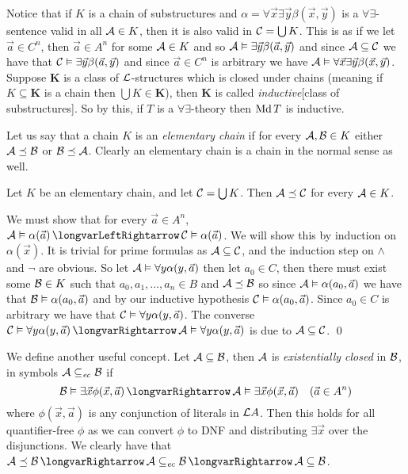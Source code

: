 \eexam

Notice that if $K$ is a chain of substructures and $\alpha=\forall\vec x\exists\vec y\beta(\vec x,\vec y)$ is a $\forall\exists$-sentence valid in all ${\cal A}\in K$, then it is also valid in
${\cal C}=\bigcup K$.
This is as if we let $\vec a\in C^n$, then $\vec a\in A^n$ for some ${\cal A}\in K$ and so ${\cal A}\vDash\exists\vec y\beta(\vec a,\vec y)$ and since ${\cal A}\subseteq{\cal C}$ we have that
${\cal C}\vDash\exists\vec y\beta(\vec a,\vec y)$ and since $\vec a\in C^n$ is arbitrary we have ${\cal A}\vDash\forall\vec x\exists\vec y\beta(\vec x,\vec y)$.
Suppose $\boldsymbol K$ is a class of ${\cal L}$-structures which is closed under chains (meaning if $K\subseteq\boldsymbol K$ is a chain then $\bigcup K\in\boldsymbol K$), then $\boldsymbol K$ is called
{\it inductive}[class of substructures].
So by this, if $T$ is a $\forall\exists$-theory then $\mathop{\rm Md} T$ is inductive.

Let us say that a chain $K$ is an {\it elementary chain} if for every ${\cal A},{\cal B}\in K$ either ${\cal A}\preceq{\cal B}$ or ${\cal B}\preceq{\cal A}$.
Clearly an elementary chain is a chain in the normal sense as well.

\blemm[title=Tarski's Chain Lemma, name=tarskichainlemma]

    Let $K$ be an elementary chain, and let ${\cal C}=\bigcup K$.
    Then ${\cal A}\preceq{\cal C}$ for every ${\cal A}\in K$.

\elemm

We must show that for every $\vec a\in A^n$, ${\cal A}\vDash\alpha(\vec a)\iff{\cal C}\vDash\alpha(\vec a)$.
We will show this by induction on $\alpha(\vec x)$.
It is trivial for prime formulas as ${\cal A}\subseteq{\cal C}$, and the induction step on $\land$ and $\neg$ are obvious.
So let ${\cal A}\vDash\forall y\alpha(y,\vec a)$ then let $a_0\in C$, then there must exist some ${\cal B}\in K$ such that $a_0,a_1,\dots,a_n\in B$ and ${\cal A}\preceq{\cal B}$ so since
${\cal A}\vDash\alpha(a_0,\vec a)$ we have that ${\cal B}\vDash\alpha(a_0,\vec a)$ and by our inductive hypothesis ${\cal C}\vDash\alpha(a_0,\vec a)$.
Since $a_0\in C$ is arbitrary we have that ${\cal C}\vDash\forall y\alpha(y,\vec a)$.
The converse ${\cal C}\vDash\forall y\alpha(y,\vec a)\implies{\cal A}\vDash\forall y\alpha(y,\vec a)$ is due to ${\cal A}\subseteq{\cal C}$.
\qed

We define another useful concept.
Let ${\cal A}\subseteq{\cal B}$, then ${\cal A}$ is {\it existentially closed} in ${\cal B}$, in symbols ${\cal A}\subseteq_{\it ec}{\cal B}$ if
$$ {\cal B}\vDash\exists\vec x\phi(\vec x,\vec a)\implies{\cal A}\vDash\exists\vec x\phi(\vec x,\vec a)\quad (\vec a\in A^n) $$
where $\phi(\vec x,\vec a)$ is any conjunction of literals in ${\cal L}A$.
Then this holds for all quantifier-free $\phi$ as we can convert $\phi$ to DNF and distributing $\exists\vec x$ over the disjunctions.
We clearly have that ${\cal A}\preceq{\cal B}\implies{\cal A}\subseteq_{\it ec}{\cal B}\implies{\cal A}\subseteq{\cal B}$.

